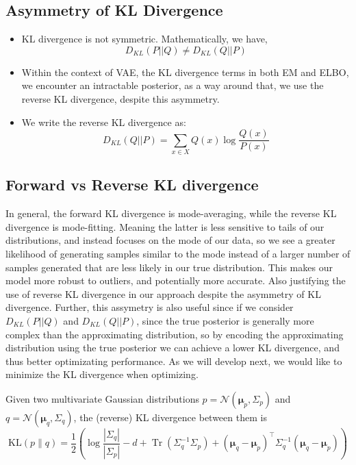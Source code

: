 \subsection{Asymmetry of KL Divergence}
\begin{itemize}
    \item KL divergence is not symmetric. Mathematically, we have, 
    \begin{equation}
    D_{KL}(P || Q) \neq D_{KL}(Q || P) 
    \end{equation}
    \item Within the context of VAE, the KL divergence terms in both EM and ELBO, we encounter an intractable posterior, as a way around that, we use the reverse KL divergence, despite this asymmetry.
    \item We write the reverse KL divergence as:
    \begin{equation}
    D_{KL}(Q || P) = \sum_{x \in X} Q(x) \log \frac{Q(x)}{P(x)}
    \end{equation}
\end{itemize}
\subsection{Forward vs Reverse KL divergence}
In general, the forward KL divergence is mode-averaging, while the reverse KL divergence is mode-fitting. Meaning the latter is less sensitive to tails of our distributions, and instead focuses on the mode of our data, so we see a greater likelihood of generating samples similar to the mode instead of a larger number of samples generated that are less likely in our true distribution. This makes our model more robust to outliers, and potentially more accurate. Also justifying the use of reverse KL divergence in our approach despite the asymmetry of KL divergence. 
Further, this assymetry is also useful since if we consider $D_{KL}(P||Q)$ and $D_{KL}(Q||P)$, since the true posterior is generally more complex than the approximating distribution, so by encoding the approximating distribution using the true posterior we can achieve a lower KL divergence, and thus better optimizating performance. As we will develop next, we would like to minimize the KL divergence when optimizing. 

\begin{theorem}
    Given two multivariate Gaussian distributions $p=\mathcal{N}(\boldsymbol{\mu}_p,\Sigma_p)$ and $q=\mathcal{N}(\boldsymbol{\mu}_q,\Sigma_q)$, the (reverse) KL divergence between them is
    \[
    \mathrm{KL}(p\|q) = \frac{1}{2} \left( \log\frac{|\Sigma_q|}{|\Sigma_p|} - d + \operatorname{Tr}(\Sigma_q^{-1}\Sigma_p) + (\boldsymbol{\mu}_q - \boldsymbol{\mu}_p)^\top \Sigma_q^{-1} (\boldsymbol{\mu}_q - \boldsymbol{\mu}_p) \right)
    \]
\end{theorem}

